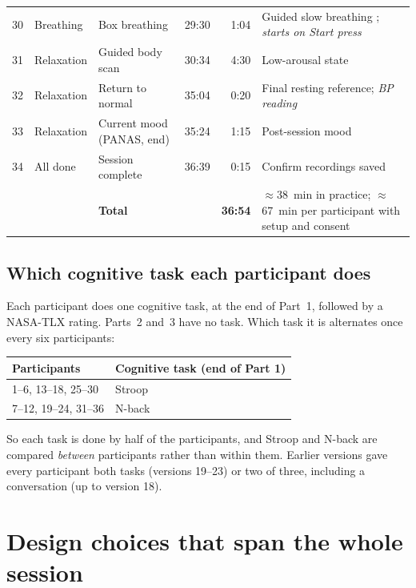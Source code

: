 \documentclass[11pt,a4paper]{article}
\begin{document}
{\begin{longtable}{@{}r >{\raggedright\arraybackslash}p{2.3cm} >{\raggedright\arraybackslash}p{4.3cm} r r >{\raggedright\arraybackslash}p{5.4cm}@{}}
30 & Breathing & Box breathing & 29:30 & 1:04 & Guided slow breathing \cite{balban2023}; \textit{starts on Start press} \\
31 & Relaxation & Guided body scan & 30:34 & 4:30 & Low-arousal state \cite{kabatzinn1990} \\
32 & Relaxation & Return to normal & 35:04 & 0:20 & Final resting reference; \textit{BP reading} \\
33 & Relaxation & Current mood (PANAS, end) & 35:24 & 1:15 & Post-session mood \cite{watson1988} \\
34 & All done & Session complete & 36:39 & 0:15 & Confirm recordings saved \\
\midrule
 & & \textbf{Total} & & \textbf{36:54} & $\approx$38~min in practice; $\approx$67~min per participant with setup and consent \\
\bottomrule
\end{longtable}
}

\subsection*{Which cognitive task each participant does}
Each participant does one cognitive task, at the end of Part~1, followed by a NASA-TLX rating. Parts~2 and~3 have
no task. Which task it is alternates once every six participants:

\begin{center}\small
\begin{tabular}{@{}ll@{}}
\toprule
Participants & Cognitive task (end of Part 1) \\
\midrule
1--6, 13--18, 25--30 & Stroop \\
7--12, 19--24, 31--36 & N-back \\
\bottomrule
\end{tabular}
\end{center}

So each task is done by half of the participants, and Stroop and N-back are compared \emph{between} participants
rather than within them. Earlier versions gave every participant both tasks (versions 19--23) or two of three,
including a conversation (up to version 18).

\section{Design choices that span the whole session}\label{sec:design}
\end{document}
